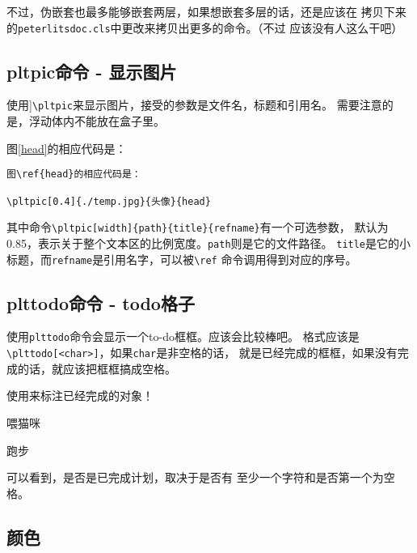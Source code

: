 \documentclass{peterlitsdoc}
\newcommand{\vb}{\verb}
\begin{document}
不过，伪嵌套也最多能够嵌套两层，如果想嵌套多层的话，还是应该在
拷贝下来的\vb|peterlitsdoc.cls|中更改来拷贝出更多的命令。（不过
应该没有人这么干吧）


\subsection{pltpic命令 - 显示图片}

使用]\vb|\pltpic|来显示图片，接受的参数是文件名，标题和引用名。
需要注意的是，浮动体内不能放在盒子里。

图\ref{head}的相应代码是：

\begin{lstlisting}
图\ref{head}的相应代码是：

\pltpic[0.4]{./temp.jpg}{头像}{head}
\end{lstlisting}


其中命令\vb|\pltpic[width]{path}{title}{refname}|有一个可选参数，
默认为0.85，表示关于整个文本区的比例宽度。\vb|path|则是它的文件路径。
\vb|title|是它的小标题，而\vb|refname|是引用名字，可以被\vb|\ref|
命令调用得到对应的序号。


\subsection{plttodo命令 - todo格子}

使用\vb|plttodo|命令会显示一个to-do框框。应该会比较棒吧。
格式应该是\vb|\plttodo[<char>]|，如果\vb|char|是非空格的话，
就是已经完成的框框，如果没有完成的话，就应该把框框搞成空格。

\begin{pltrun}
使用\plttodo[x]来标注已经完成的对象！

\plttodo[x]喂猫咪

\plttodo[ ]跑步

可以看到，是否是已完成计划，取决于是否有
至少一个字符和是否第一个为空格。

\plttodo[]  \plttodo[x]  \plttodo[  ]
\plttodo[ ] \plttodo[aa] \plttodo[ a]
\end{pltrun}


\subsection{颜色}
\end{document}
